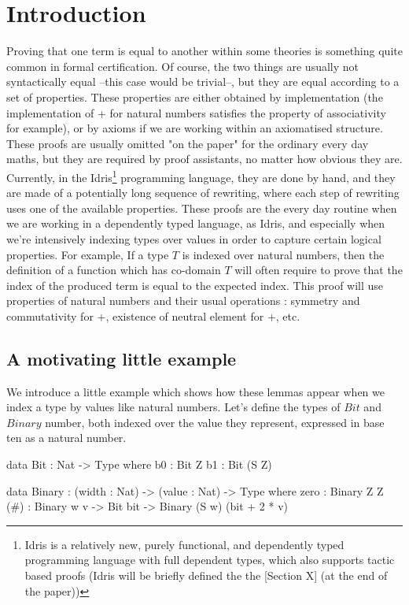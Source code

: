 \section{Introduction}


Proving that one term is equal to another within some theories is something quite common in formal certification. Of course, the two things are usually not syntactically equal --this case would be trivial--, but they are equal according to a set of properties. These properties are either obtained by implementation (the implementation of + for natural numbers satisfies the property of associativity for example), or by axioms if we are working within an axiomatised structure. 
These proofs are usually omitted "on the paper" for the ordinary every day maths, but they are required by proof assistants, no matter how obvious they are. Currently, in the Idris\footnote{Idris is a relatively new, purely functional, and dependently typed programming language with full dependent types, which also supports tactic based proofs  (Idris will be briefly defined the the [Section X] (at the end of the paper))} programming language, they are done by hand, and they are made of a potentially long sequence of rewriting, where each step of rewriting uses one of the available properties. 
These proofs are the every day routine when we are working in a dependently typed language, as Idris, and especially when we're intensively indexing types over values in order to capture certain logical properties.
For example, If a type $T$ is indexed over natural numbers, then the definition of a function which has co-domain $T$ will often require to prove that the index of the produced term is equal to the expected index. This proof will use properties of natural numbers and their usual operations : symmetry and commutativity for +, existence of neutral element for +, etc.

\subsection{A motivating little example}
We introduce a little example which shows how these lemmas appear when we index a type by values like natural numbers.
Let's define the types of $Bit$ and $Binary$ number, both indexed over the value they represent, expressed in base ten as a natural number.
\begin{code}[caption=Bit and binary number, captionpos=b, label=lst1:haskell2]
data Bit : Nat -> Type where
     b0 : Bit Z
     b1 : Bit (S Z)
     
data Binary : (width : Nat) -> (value : Nat) 
              -> Type where
     zero : Binary Z Z
     (#) : Binary w v -> Bit bit 
           -> Binary (S w) (bit + 2 * v)
\end{code}

